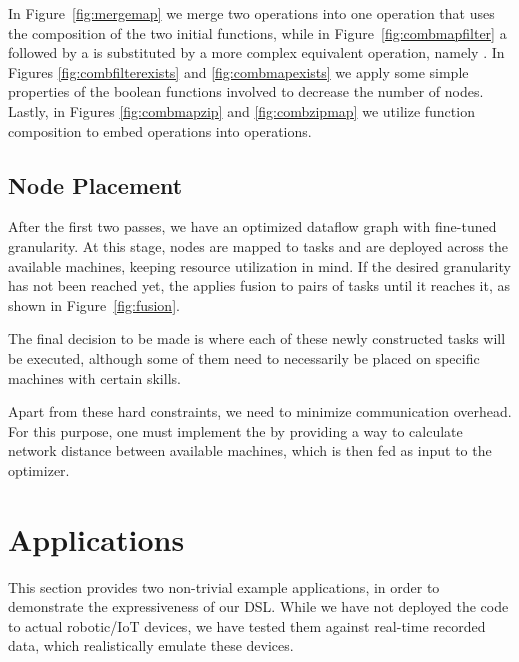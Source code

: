 \documentclass[sigplan,screen,10pt]{acmart}
\begin{document}

In Figure~\ref{fig:mergemap} we merge two  operations into
one  operation that uses the composition of the two initial
functions, while in Figure~\ref{fig:combmapfilter} a  followed
by a  is substituted by a more complex equivalent operation,
namely . In Figures \ref{fig:combfilterexists} and
\ref{fig:combmapexists} we apply some simple properties of the boolean functions
involved to decrease the number of nodes. Lastly, in Figures \ref{fig:combmapzip} and
\ref{fig:combzipmap} we utilize function composition to embed 
operations into  operations.

\subsection{Node Placement}

After the first two passes, we have an optimized dataflow graph with fine-tuned
granularity. At this stage, nodes are mapped to tasks and are deployed across
the available machines, keeping resource utilization in mind.
If the desired granularity has not been reached yet, the
 applies fusion to pairs of tasks until it reaches
it, as shown in Figure~\ref{fig:fusion}.
%

The final decision to be made is where each of these newly constructed tasks
will be executed, although some of them need to necessarily be placed on
specific machines with certain skills.

Apart from these hard constraints, we need to minimize communication overhead.
For this purpose, one must implement the  by providing
a way to calculate network distance between available machines, which is then
fed as input to the  optimizer.

\section{Applications} \label{sec:applications}

This section provides two non-trivial example applications, in order to demonstrate
the expressiveness of our DSL.
While we have not deployed the code to actual robotic/IoT devices, we have tested
them against real-time recorded data, which realistically emulate these devices.
\end{document}
